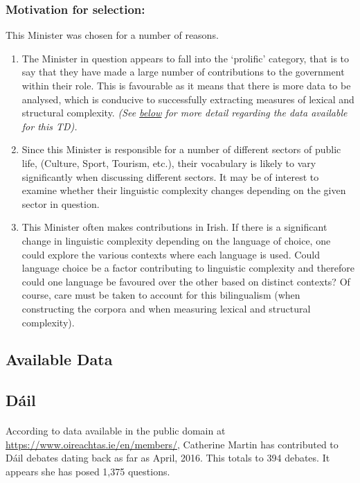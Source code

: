 \documentclass[a4paper,11pt]{article}
\begin{document}
\subsubsection{Motivation for selection:}
This Minister was chosen for a number of reasons.
\begin{enumerate} 
\item The Minister in question appears to fall into the `prolific' category, that is to say that they have made a large number of contributions to the government within their role. This is favourable as it means that there is more data to be analysed, which is conducive to successfully extracting measures of lexical and structural complexity. \textit{(See \hyperref[sec:data]{below} for more detail regarding the data available for this TD).}
\item Since this Minister is responsible for a number of different sectors of public life, (Culture, Sport, Tourism, etc.), their vocabulary is likely to vary significantly when discussing different sectors. It may be of interest to examine whether their linguistic complexity changes depending on the given sector in question.
\item This Minister often makes contributions in Irish. If there is a significant change in linguistic complexity depending on the language of choice, one could explore the various contexts where each language is used. Could language choice be a factor contributing to linguistic complexity and therefore could one language be favoured over the other based on distinct contexts? Of course, care must be taken to account for this bilingualism (when constructing the corpora and when measuring lexical and structural complexity).
\end{enumerate}

\subsection{Available Data}
\label{sec:data}
\subsection{Dáil}
\paragraph{}
According to data available in the public domain at \url{https://www.oireachtas.ie/en/members/}, Catherine Martin has contributed to Dáil debates dating back as far as April, 2016. This totals to 394 debates. It appears she has posed 1,375 questions.
\end{document}
